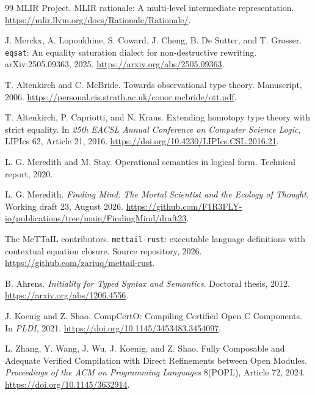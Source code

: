 \documentclass[11pt]{article}
\theoremstyle{definition}
\theoremstyle{remark}
\begin{document}
\begin{thebibliography}{99}
MLIR Project.
\newblock MLIR rationale: A multi-level intermediate representation.
\newblock \url{https://mlir.llvm.org/docs/Rationale/Rationale/}.

J. Merckx, A. Lopoukhine, S. Coward, J. Cheng, B. De Sutter, and T. Grosser.
\newblock \texttt{eqsat}: An equality saturation dialect for non-destructive
  rewriting.
\newblock arXiv:2505.09363, 2025.
\newblock \url{https://arxiv.org/abs/2505.09363}.

T. Altenkirch and C. McBride.
\newblock Towards observational type theory.
\newblock Manuscript, 2006.
\newblock \url{https://personal.cis.strath.ac.uk/conor.mcbride/ott.pdf}.

T. Altenkirch, P. Capriotti, and N. Kraus.
\newblock Extending homotopy type theory with strict equality.
\newblock In \emph{25th EACSL Annual Conference on Computer Science Logic},
  LIPIcs 62, Article 21, 2016.
\newblock \url{https://doi.org/10.4230/LIPIcs.CSL.2016.21}.

L. G. Meredith and M. Stay.
\newblock Operational semantics in logical form.
\newblock Technical report, 2020.

L. G. Meredith.
\newblock \emph{Finding Mind: The Mortal Scientist and the Ecology of
  Thought}.
\newblock Working draft 23, August 2026.
\newblock \url{https://github.com/F1R3FLY-io/publications/tree/main/FindingMind/draft23}.

The MeTTaIL contributors.
\newblock \texttt{mettail-rust}: executable language definitions with
  contextual equation closure.
\newblock Source repository, 2026.
\newblock \url{https://github.com/zariuq/mettail-rust}.

B. Ahrens.
\newblock \emph{Initiality for Typed Syntax and Semantics}.
\newblock Doctoral thesis, 2012.
\newblock \url{https://arxiv.org/abs/1206.4556}.

J. Koenig and Z. Shao.
\newblock CompCertO: Compiling Certified Open C Components.
\newblock In \emph{PLDI}, 2021.
\newblock \url{https://doi.org/10.1145/3453483.3454097}.

L. Zhang, Y. Wang, J. Wu, J. Koenig, and Z. Shao.
\newblock Fully Composable and Adequate Verified Compilation with Direct
  Refinements between Open Modules.
\newblock \emph{Proceedings of the ACM on Programming Languages}
  8(POPL), Article 72, 2024.
\newblock \url{https://doi.org/10.1145/3632914}.


\end{thebibliography}
\end{document}
